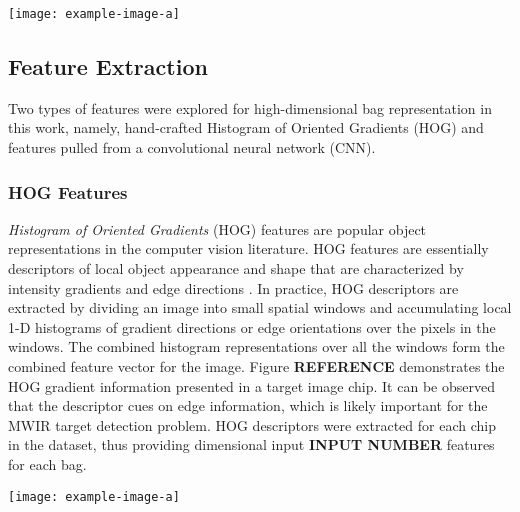 \begin{center}
	\begin{figure*}[h]
		\centering
		\texttt{[image: example-image-a]}
		\caption[Image Chip Extraction]{}
		\label{fig:chip_extraction}
	\end{figure*}
\end{center}

\subsection{Feature Extraction}
Two types of features were explored for high-dimensional bag representation in this work, namely, hand-crafted Histogram of Oriented Gradients (HOG) and features pulled from a convolutional neural network (CNN).  

\subsubsection{HOG Features}

\textit{Histogram of Oriented Gradients} (HOG) features are popular object representations in the computer vision literature.  HOG features are essentially descriptors of local object appearance and shape that are characterized by intensity gradients and edge directions \citep{Dalal2005HOG}.  In practice, HOG descriptors are extracted by dividing an image into small spatial windows and accumulating local 1-D histograms of gradient directions or edge orientations over the pixels in the windows.  The combined histogram representations over all the windows form the combined feature vector for the image.  Figure \textbf{REFERENCE} demonstrates the HOG gradient information presented in a target image chip.  It can be observed that the descriptor cues on edge information, which is likely important for the MWIR target detection problem.  HOG descriptors were extracted for each chip in the dataset, thus providing dimensional input \textbf{INPUT NUMBER} features for each bag.  

\begin{center}
	\begin{figure*}[h]
		\centering
		\texttt{[image: example-image-a]}
		\caption[HOG features]{}
		\label{fig:hog_features}
	\end{figure*}
\end{center}

